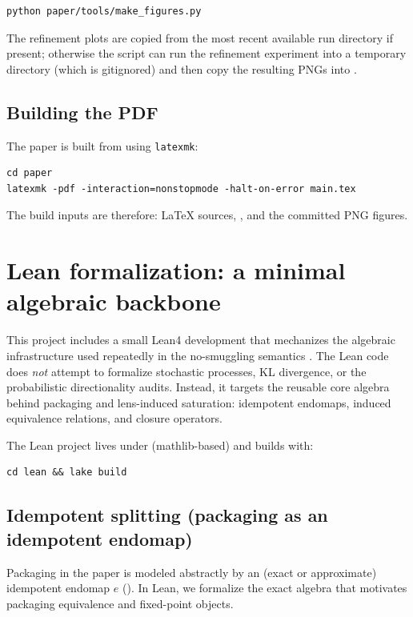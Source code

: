 \documentclass[11pt]{article}
\theoremstyle{definition}
\theoremstyle{remark}
\begin{document}
\begin{verbatim}
python paper/tools/make_figures.py
\end{verbatim}

The refinement plots are copied from the most recent available run directory if present; otherwise the script can run the refinement experiment into a temporary  directory (which is gitignored) and then copy the resulting PNGs into .

\subsection{Building the PDF}

The paper is built from  using \texttt{latexmk}:

\begin{verbatim}
cd paper
latexmk -pdf -interaction=nonstopmode -halt-on-error main.tex
\end{verbatim}

The build inputs are therefore: LaTeX sources, , and the committed PNG figures.
\fussy
 \section{Lean formalization: a minimal algebraic backbone}
\label{app:lean}

This project includes a small Lean4 development that mechanizes the algebraic infrastructure used repeatedly in the no-smuggling semantics \citep{demoura2021lean4,mathlib2020}.
The Lean code does \emph{not} attempt to formalize stochastic processes, KL divergence, or the probabilistic directionality audits.
Instead, it targets the reusable core algebra behind packaging and lens-induced saturation: idempotent endomaps, induced equivalence relations, and closure operators.

The Lean project lives under  (mathlib-based) and builds with:
\begin{verbatim}
cd lean && lake build
\end{verbatim}

\subsection{Idempotent splitting (packaging as an idempotent endomap)}

Packaging in the paper is modeled abstractly by an (exact or approximate) idempotent endomap $e$ ().
In Lean, we formalize the exact algebra that motivates packaging equivalence and fixed-point objects.
\end{document}
